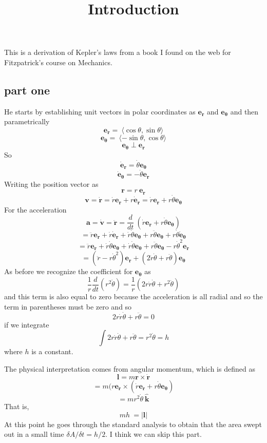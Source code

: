 \documentclass[11pt, oneside]{article}
\title{Introduction}
\date{}
\begin{document}
\maketitle
\Large

This is a derivation of Kepler's laws from a book I found on the web for Fitzpatrick's course on Mechanics.

\subsection*{part one}
He starts by establishing unit vectors in polar coordinates as $\mathbf{e_r}$ and $\mathbf{e_{\theta}}$ and then parametrically
\[ \mathbf{e_r} =  \ \langle \cos \theta, \sin \theta \rangle \]
\[ \mathbf{e_{\theta}} =  \ \langle -\sin \theta, \cos \theta \rangle \]
\[ \mathbf{e_{\theta}} \perp \mathbf{e_r} \]
So
\[ \dot{\mathbf{e}}_\mathbf{r} = \dot{\theta} \mathbf{e_{\theta}} \]
\[ \dot{\mathbf{e}}_\mathbf{\theta} = -\dot{\theta} \mathbf{e_{r}} \]
Writing the position vector as
\[ \mathbf{r} = r \ \mathbf{e_r}  \]
\[ \mathbf{v} = \dot{\mathbf{r}} = \dot{r}\mathbf{e_r} + r \dot{\mathbf{e}}_\mathbf{r} =\dot{r}\mathbf{e_r} + r \dot{\theta} \mathbf{e_{\theta}} \]
For the acceleration
\[ \mathbf{a} = \dot{\mathbf{v}} = \ddot{\mathbf{r}} = \frac{d}{dt} \ (\dot{r}\mathbf{e_r} + r \dot{\theta} \mathbf{e_{\theta}}) \]
 \[ = \ddot{r}\mathbf{e_r} + \dot{r}\dot{\mathbf{e}}_\mathbf{r} + \dot{r} \dot{\theta} \mathbf{e_{\theta}} + r \ddot{\theta} \mathbf{e_{\theta}} + r \dot{\theta}  \dot{\mathbf{e}}_\mathbf{\theta}\]
\[ = \ddot{r}\mathbf{e_r} + \dot{r}\dot{\theta} \mathbf{e_{\theta}} + \dot{r} \dot{\theta} \mathbf{e_{\theta}} + r \ddot{\theta} \mathbf{e_{\theta}} - r \dot{\theta}^2  \mathbf{e}_\mathbf{r}\]
\[ = (\ddot{r} - r \dot{\theta}^2)  \mathbf{e}_\mathbf{r} + (2\dot{r} \dot{\theta} + r \ddot{\theta}) \mathbf{e_{\theta}}  \]
As before we recognize the coefficient for $\mathbf{e_{\theta}}$ as
\[ \frac{1}{r} \frac{d}{dt} (r^2\dot{\theta}) = \frac{1}{r}(2r \dot{r} \dot{\theta} + r^2\ddot{\theta})  \]
and this term is also equal to zero because the acceleration is all radial and so the term in parentheses must be zero and so
\[ 2 r \dot{r} \dot{\theta} + r\ddot{\theta} =  0 \]
if we integrate
\[ \int 2 r \dot{r} \dot{\theta} + r\ddot{\theta} = r^2 \dot{\theta} =  h \]
where $h$ is a constant.

The physical interpretation comes from angular momentum, which is defined as
\[ \mathbf{l} = m \mathbf{r} \times \dot{\mathbf{r}} \]
\[ = m (r \mathbf{e}_\mathbf{r} \times (\dot{r}\mathbf{e_r} + r \dot{\theta} \mathbf{e_{\theta}}) \]
\[ = mr^2  \dot{\theta} \ \hat{\mathbf{k}} \]
That is,
\[ mh \ = | \mathbf{l} | \]
At this point he goes through the standard analysis to obtain that the area swept out in a small time $\delta A/\delta t = h/2$.  I think we can skip this part.
\end{document}
